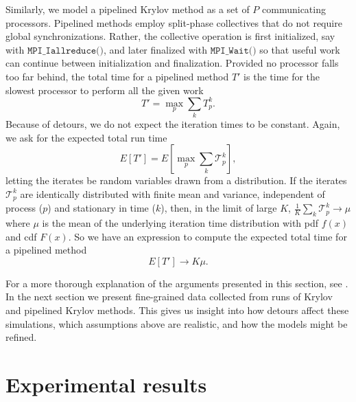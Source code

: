 \documentclass[sigconf]{acmart}
\begin{document}
Similarly, we model a pipelined Krylov method as a set of $P$ communicating processors. Pipelined methods employ split-phase collectives that do not require global synchronizations. Rather, the collective operation is first initialized, say with  ${\texttt{MPI\_Iallreduce()}}$, and later finalized with ${\texttt{MPI\_Wait()}}$ so that useful work can continue between initialization and finalization. 
Provided no processor falls too far behind, the total time for a pipelined method $T'$ is the time for the slowest processor to perform all the given work 
\begin{equation}
T' = \max_p \sum_k T^k_p.
\end{equation}
Because of detours, we do not expect the iteration times to be constant. Again, we ask for the expected total run time
\begin{equation}
E[T'] = E\left[\max_p \sum_k \mathcal{T}^k_p\right], \label{eq:pipeline-expression}
\end{equation}
letting the iterates be random variables drawn from a distribution. 
If the iterates $\mathcal{T}^k_p$ are identically distributed with finite mean and variance, independent of process ($p$) and stationary in time ($k$), then, in the limit of large $K$, $\tfrac{1}{K}\sum_k\mathcal{T}^k_p \rightarrow \mu$ where $\mu$ is the mean of the underlying iteration time distribution with pdf $f(x)$ and cdf $F(x)$. So we have an expression to compute the expected total time for a pipelined method
\begin{equation}
E[T'] \rightarrow K\mu. \label{eq:pipeline-model}
\end{equation}

For a more thorough explanation of the arguments presented in this section, see \cite{morgan2016krylov}.
In the next section we present fine-grained data collected from runs of Krylov and pipelined Krylov methods. This gives us insight into how detours affect these simulations, which assumptions above are realistic, and how the models might be refined. 

\section{Experimental results} \label{sec:experimental-results}
\end{document}
